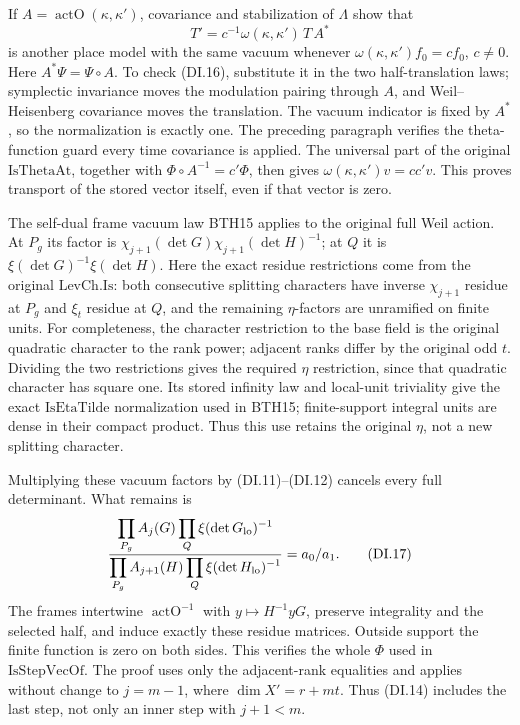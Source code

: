 If \(A=\operatorname{actO}(\kappa,\kappa')\), covariance and
stabilization of \(\Lambda\) show that
\[
             T'=c^{-1}\omega(\kappa,\kappa')\,T\,A^*
 \tag{DI.16}
\]
is another place model with the same vacuum whenever
\(\omega(\kappa,\kappa')f_0=cf_0\), \(c\ne0\).
Here \(A^*\Psi=\Psi\circ A\). To check (DI.16), substitute it
in the two half-translation laws; symplectic invariance moves the
modulation pairing through \(A\), and Weil--Heisenberg covariance
moves the translation. The vacuum indicator is fixed by \(A^*\),
so the normalization is exactly one. The preceding paragraph verifies
the theta-function guard every time covariance is applied. The
universal part of the original \(\mathrm{IsThetaAt}\), together
with \(\Phi\circ A^{-1}=c'\Phi\), then gives
\(\omega(\kappa,\kappa')v=cc'v\). This proves transport of the
stored vector itself, even if that vector is zero.

The self-dual frame vacuum law BTH15 applies to the original full
Weil action. At \(P_g\) its factor is
\(\chi_{j+1}(\det G)\chi_{j+1}(\det H)^{-1}\); at \(Q\) it is
\(\xi(\det G)^{-1}\xi(\det H)\).
Here the exact residue restrictions come from the original
\(\mathrm{LevCh.Is}\): both consecutive splitting characters have
inverse \(\chi_{j+1}\) residue at \(P_g\) and \(\xi_t\) residue
at \(Q\), and the remaining \(\eta\)-factors are unramified on
finite units. For completeness, the character restriction to the
base field is the original quadratic character to the rank power;
adjacent ranks differ by the original odd \(t\). Dividing the two
restrictions gives the required \(\eta\) restriction, since that
quadratic character has square one. Its stored infinity law and
local-unit triviality give the exact \(\mathrm{IsEtaTilde}\)
normalization used in BTH15; finite-support integral units are dense
in their compact product. Thus this use retains the original
\(\eta\), not a new splitting character.

Multiplying these vacuum factors by (DI.11)--(DI.12) cancels every
full determinant. What remains is
\[
 \frac{\displaystyle
   \prod_{P_g}A_j(G)\prod_Q\xi(\det G_{\rm lo})^{-1}}
 {\displaystyle
   \prod_{P_g}A_{j+1}(H)\prod_Q\xi(\det H_{\rm lo})^{-1}}
                          =a_0/a_1 .
 \tag{DI.17}
\]
The frames intertwine \(\operatorname{actO}^{-1}\) with
\(y\mapsto H^{-1}yG\), preserve integrality and the selected half,
and induce exactly these residue matrices. Outside support the
finite function is zero on both sides. This verifies the whole
\(\Phi\) used in \(\mathrm{IsStepVecOf}\).
The proof uses only the adjacent-rank equalities and applies without
change to \(j=m-1\), where \(\dim X'=r+mt\). Thus (DI.14) includes
the last step, not only an inner step with \(j+1<m\).

